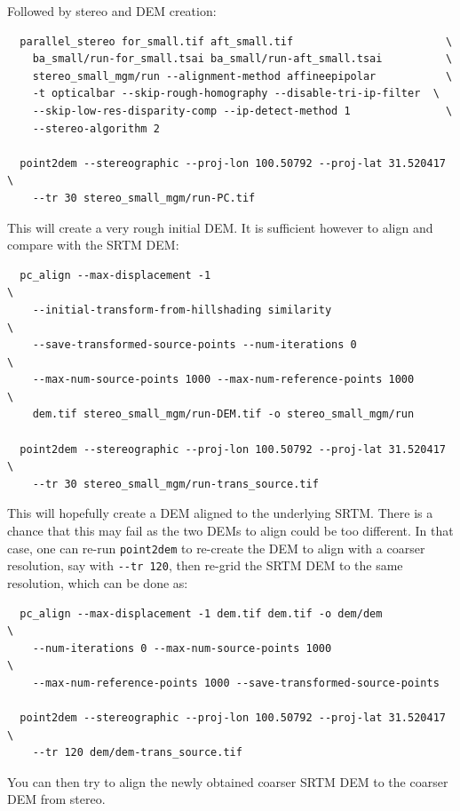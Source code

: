 Followed by stereo and DEM creation:

\begin{verbatim}
  parallel_stereo for_small.tif aft_small.tif                        \
    ba_small/run-for_small.tsai ba_small/run-aft_small.tsai          \
    stereo_small_mgm/run --alignment-method affineepipolar           \
    -t opticalbar --skip-rough-homography --disable-tri-ip-filter  \
    --skip-low-res-disparity-comp --ip-detect-method 1               \
    --stereo-algorithm 2 

  point2dem --stereographic --proj-lon 100.50792 --proj-lat 31.520417 \
    --tr 30 stereo_small_mgm/run-PC.tif
\end{verbatim}

This will create a very rough initial DEM. It is sufficient however
to align and compare with the SRTM DEM:

\begin{verbatim}
  pc_align --max-displacement -1                                      \
    --initial-transform-from-hillshading similarity                   \
    --save-transformed-source-points --num-iterations 0               \
    --max-num-source-points 1000 --max-num-reference-points 1000      \
    dem.tif stereo_small_mgm/run-DEM.tif -o stereo_small_mgm/run

  point2dem --stereographic --proj-lon 100.50792 --proj-lat 31.520417 \
    --tr 30 stereo_small_mgm/run-trans_source.tif
\end{verbatim}

This will hopefully create a DEM aligned to the underlying SRTM. There
is a chance that this may fail as the two DEMs to align could be too
different. In that case, one can re-run \texttt{point2dem} to re-create
the DEM to align with a coarser resolution, say with \texttt{-\/-tr
120}, then re-grid the SRTM DEM to the same resolution, which can be
done as:

\begin{verbatim}
  pc_align --max-displacement -1 dem.tif dem.tif -o dem/dem             \
    --num-iterations 0 --max-num-source-points 1000                     \
    --max-num-reference-points 1000 --save-transformed-source-points

  point2dem --stereographic --proj-lon 100.50792 --proj-lat 31.520417   \
    --tr 120 dem/dem-trans_source.tif
\end{verbatim}

You can then try to align the newly obtained coarser SRTM DEM to the 
coarser DEM from stereo. 

